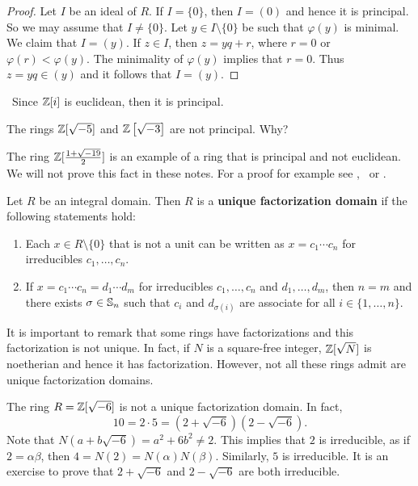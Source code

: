 \begin{proof}
	Let $I$ be an ideal of $R$. If $I=\{0\}$, then $I=(0)$ and hence 
	it is principal. So we may
	assume that $I\ne\{0\}$. Let $y\in I\setminus\{0\}$ be such that
	$\varphi(y)$ is minimal. We claim that $I=(y)$. 
	If $z\in I$, then $z=yq+r$, where $r=0$ or $\varphi(r)<\varphi(y)$. 
	The minimality of $\varphi(y)$ implies that $r=0$. Thus $z=yq\in (y)$ and 
	it follows that 
	$I=(y)$. 
\end{proof}

\begin{example}\
	Since $\mathbb{Z}[i]$ is euclidean, then it is principal.
\end{example}
 
\begin{example}
	The rings $\mathbb{Z}[\sqrt{-5}]$ and $\mathbb{Z}\left[\sqrt{-3}\right]$ are
	not principal. Why?
\end{example}

The ring $\mathbb{Z}[\frac{1+\sqrt{-19}}{2}]$ is an 
example of a ring that is principal and not euclidean. We will not prove this
fact in these notes. For a proof 
for example see \cite{MR967349}, \cite{MR3665445} or \cite{MR314831}.


\begin{definition}
	Let $R$ be an integral domain. Then $R$ is a 
	\textbf{unique factorization domain}
	if the following statements hold:
	\begin{enumerate}
	\item Each $x\in R\setminus\{0\}$ that is not a unit can be written as $x=c_1\cdots c_n$ for irreducibles $c_1,\dots,c_n$. 
	\item If $x=c_1\cdots c_n=d_1\cdots d_m$ for irreducibles $c_1,\dots,c_n$ and $d_1,\dots,d_m$, then $n=m$ and there exists $\sigma\in\mathbb{S}_n$ such that $c_i$ and $d_{\sigma(i)}$ are
		associate for all $i\in\{1,\dots,n\}$. 
	\end{enumerate}
\end{definition}

It is important to remark that some rings 
have factorizations and this factorization is not unique. 
In fact, if $N$ is a square-free integer, $\mathbb{Z}[\sqrt{N}]$ is noetherian and hence it   
has factorization. 
However, not all these rings admit are unique factorization domains. 

\begin{example}
	The ring $R=\mathbb{Z}[\sqrt{-6}]$ is not a unique factorization domain. In fact,
	\[
	10=2\cdot 5=(2+\sqrt{-6})(2-\sqrt{-6}).
	\]	
	Note that $N(a+b\sqrt{-6})=a^2+6b^2\ne 2$. This implies that $2$ is irreducible, as 
	if $2=\alpha\beta$, then $4=N(2)=N(\alpha)N(\beta)$. 
	Similarly, $5$ is irreducible. It is an exercise to prove that 
	$2+\sqrt{-6}$ and $2-\sqrt{-6}$ are both irreducible. 
\end{example}



